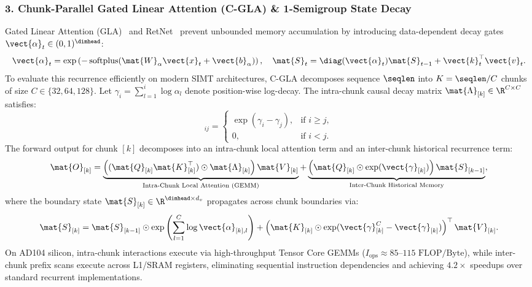 \subsubsection{3. Chunk-Parallel Gated Linear Attention (C-GLA) \& 1-Semigroup State Decay}
\label{subsubsec:cgla_contract}
Gated Linear Attention (GLA)~\cite{yang2023gated} and RetNet~\cite{sun2023retentive} prevent unbounded memory accumulation by introducing data-dependent decay gates $\vect{\alpha}_t \in (0, 1)^{\dimhead}$:
\begin{equation}
\vect{\alpha}_t = \exp\left(-\operatorname{softplus}(\mat{W}_\alpha \vect{x}_t + \vect{b}_\alpha)\right), \quad \mat{S}_t = \diag(\vect{\alpha}_t) \mat{S}_{t-1} + \vect{k}_t^\top \vect{v}_t.
\label{eq:gla_decay_recurrence_exact}
\end{equation}
To evaluate this recurrence efficiently on modern SIMT architectures, C-GLA decomposes sequence $\seqlen$ into $K = \seqlen / C$ chunks of size $C \in \{32, 64, 128\}$. Let $\gamma_i = \sum_{l=1}^i \log \alpha_l$ denote position-wise log-decay. The intra-chunk causal decay matrix $\mat{\Lambda}_{[k]} \in \R^{C \times C}$ satisfies:
\begin{equation}
[\mat{\Lambda}_{[k]}]_{ij} = \begin{cases} 
\exp\left( \gamma_{i} - \gamma_{j} \right), & \text{if } i \ge j, \\ 
0, & \text{if } i < j. 
\end{cases}
\end{equation}
The forward output for chunk $[k]$ decomposes into an intra-chunk local attention term and an inter-chunk historical recurrence term:
\begin{equation}
\mat{O}_{[k]} = \underbrace{\left( (\mat{Q}_{[k]} \mat{K}_{[k]}^\top) \odot \mat{\Lambda}_{[k]} \right) \mat{V}_{[k]}}_{\text{Intra-Chunk Local Attention (GEMM)}} + \underbrace{\left( \mat{Q}_{[k]} \odot \exp(\vect{\gamma}_{[k]}) \right) \mat{S}_{[k-1]}}_{\text{Inter-Chunk Historical Memory}},
\label{eq:chunk_gla_forward_decomposition}
\end{equation}
where the boundary state $\mat{S}_{[k]} \in \R^{\dimhead \times d_v}$ propagates across chunk boundaries via:
\begin{equation}
\mat{S}_{[k]} = \mat{S}_{[k-1]} \odot \exp\left(\sum_{l=1}^C \log \vect{\alpha}_{[k], l}\right) + \left( \mat{K}_{[k]} \odot \exp(\vect{\gamma}_{[k]}^C - \vect{\gamma}_{[k]}) \right)^\top \mat{V}_{[k]}.
\label{eq:chunk_boundary_update}
\end{equation}
On AD104 silicon, intra-chunk interactions execute via high-throughput Tensor Core GEMMs ($I_{\text{ops}} \approx 85\text{--}115\text{ FLOP/Byte}$), while inter-chunk prefix scans execute across L1/SRAM registers, eliminating sequential instruction dependencies and achieving $4.2\times$ speedups over standard recurrent implementations.

